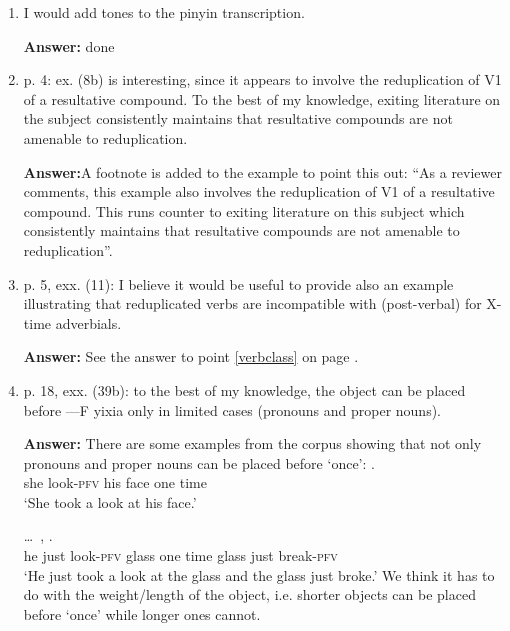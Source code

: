 \documentclass[fleqn,twoside]{article}
\begin{document}
\begin{enumerate}
\item
I would add tones to the pinyin transcription.

\textbf{Answer:} done

\item
p. 4: ex. (8b) is interesting, since it appears to involve the reduplication of V1 of a resultative compound. To the best of my knowledge, exiting literature on the subject consistently maintains that resultative compounds are not amenable to reduplication.


\textbf{Answer:}A footnote is added to the example to point this out: 
``As a reviewer comments, this example also involves the reduplication of V1 of a resultative compound. 
This runs counter to exiting literature on this subject which consistently maintains that resultative compounds are not amenable to reduplication''.

\item
p. 5, exx. (11): I believe it would be useful to provide also an example illustrating that reduplicated verbs are incompatible with (post-verbal) for X-time adverbials.

\textbf{Answer:} See the answer to point \ref{verbclass} on page \pageref{verbclass}.

\item
p. 18, exx. (39b): to the best of my knowledge, the object can be placed before —F yixia only in limited cases (pronouns and proper nouns).

\noindent
\textbf{Answer:}
There are some examples from the corpus showing that not only pronouns and proper nouns can be placed before   `once':
\ea%
\gll {}     .\\
she look-\textsc{pfv} his face one time\\
\glt `She took a look at his face.'

\ex%
\gll {} \ldots\,     ,   .\\
he {} just look-\textsc{pfv} glass one time glass just break-\textsc{pfv}\\
\glt `He just took a look at the glass and the glass just broke.'
\z
We think it has to do with the weight/length of the object, i.e. shorter objects can be placed before    `once' while longer ones cannot.


\end{enumerate}
\end{document}
